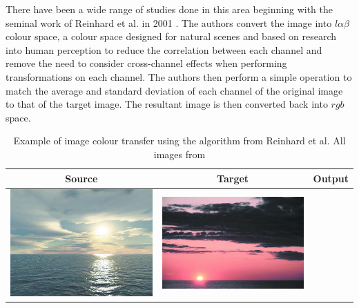 There have been a wide range of studies done in this area beginning with the seminal work of Reinhard et al. in 2001 \cite{reinhard_2001_transfer}. The authors convert the image into $l\alpha\beta$ colour space, a colour space designed for natural scenes and based on research into human perception to reduce the correlation between each channel and remove the need to consider cross-channel effects when performing transformations on each channel. The authors then perform a simple operation to match the average and standard deviation of each channel of the original image to that of the target image. The resultant image is then converted back into $rgb$ space.

\begin{table}[H]
    \centering
    \caption{Example of image colour transfer using the algorithm from Reinhard et al. All images from \cite{reinhard_2001_transfer} \label{tab:reinhard_demo}}
\begin{tabular}{|c|c|c|}
    \hline
    Source & Target & Output \\
    \hline
  \begin{minipage}{.29\textwidth}
    \includegraphics[width=\textwidth,height=\textheight,keepaspectratio]{images/reinhard_orig1}
  \end{minipage} & 
  \begin{minipage}{.29\textwidth}
    \includegraphics[width=\textwidth,height=\textheight,keepaspectratio]{images/reinhard_target1}

\end{minipage}
\end{tabular}
\end{table}
